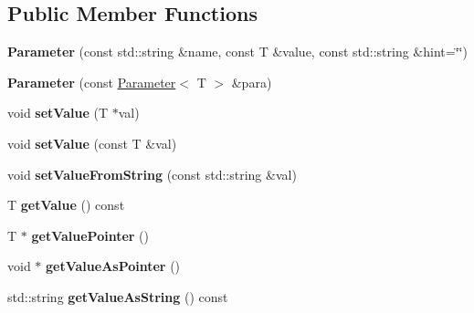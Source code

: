 \subsection*{Public Member Functions}
\begin{DoxyCompactItemize}
\item 
\hypertarget{classrr_1_1_parameter_ac42dc71c4014a2c09418aeb3a4a95ea4}{{\bfseries Parameter} (const std\-::string \&name, const T \&value, const std\-::string \&hint=\char`\"{}\char`\"{})}\label{classrr_1_1_parameter_ac42dc71c4014a2c09418aeb3a4a95ea4}

\item 
\hypertarget{classrr_1_1_parameter_a1ed95fb3492a0c1fa7a0994ce9f596d3}{{\bfseries Parameter} (const \hyperlink{classrr_1_1_parameter}{Parameter}$<$ T $>$ \&para)}\label{classrr_1_1_parameter_a1ed95fb3492a0c1fa7a0994ce9f596d3}

\item 
\hypertarget{classrr_1_1_parameter_a73b2b6a59ce42a2134ebe16e63a1191e}{void {\bfseries set\-Value} (T $\ast$val)}\label{classrr_1_1_parameter_a73b2b6a59ce42a2134ebe16e63a1191e}

\item 
\hypertarget{classrr_1_1_parameter_afffa9ac91cbe7fe12c97ffd01a9d8702}{void {\bfseries set\-Value} (const T \&val)}\label{classrr_1_1_parameter_afffa9ac91cbe7fe12c97ffd01a9d8702}

\item 
\hypertarget{classrr_1_1_parameter_a6d9ea39f1568e04aeb561ecb635993b8}{void {\bfseries set\-Value\-From\-String} (const std\-::string \&val)}\label{classrr_1_1_parameter_a6d9ea39f1568e04aeb561ecb635993b8}

\item 
\hypertarget{classrr_1_1_parameter_abc781e92245aa324e61b0d5e3595bf59}{T {\bfseries get\-Value} () const }\label{classrr_1_1_parameter_abc781e92245aa324e61b0d5e3595bf59}

\item 
\hypertarget{classrr_1_1_parameter_a88203bbcf10ce75f13a4350063fc5ae2}{T $\ast$ {\bfseries get\-Value\-Pointer} ()}\label{classrr_1_1_parameter_a88203bbcf10ce75f13a4350063fc5ae2}

\item 
\hypertarget{classrr_1_1_parameter_a0354fcff28c0d7dfd40b5f0717805999}{void $\ast$ {\bfseries get\-Value\-As\-Pointer} ()}\label{classrr_1_1_parameter_a0354fcff28c0d7dfd40b5f0717805999}

\item 
\hypertarget{classrr_1_1_parameter_a6bf0c3b828ac4bd33089c7bbfb6804af}{std\-::string {\bfseries get\-Value\-As\-String} () const }\label{classrr_1_1_parameter_a6bf0c3b828ac4bd33089c7bbfb6804af}


\end{DoxyCompactItemize}
